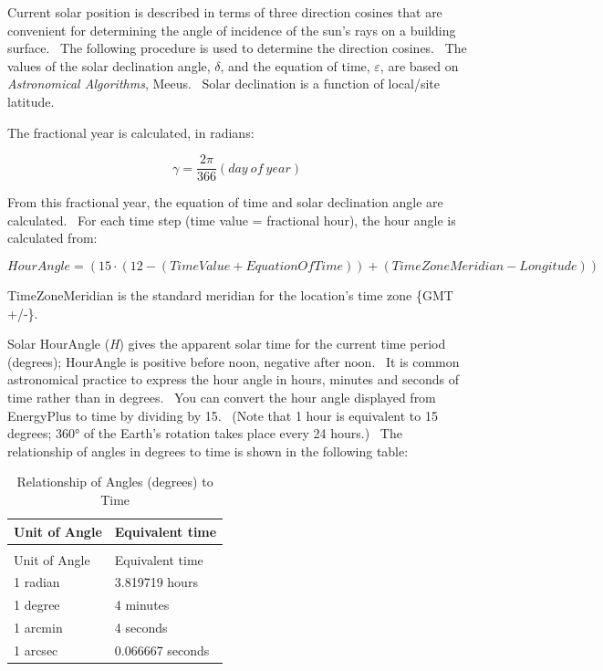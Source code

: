 Current solar position is described in terms of three direction cosines that are convenient for determining the angle of incidence of the sun's rays on a building surface.~ The following procedure is used to determine the direction cosines.~ The values of the solar declination angle, $\delta$, and the equation of time, $\varepsilon$, are based on \emph{Astronomical Algorithms}, Meeus.~ Solar declination is a function of local/site latitude.

The fractional year is calculated, in radians:

\begin{equation}
\gamma  = \frac{{2\pi }}{{366}}(day~of~year)
\end{equation}

From this fractional year, the equation of time and solar declination angle are calculated.~ For each time step (time value = fractional hour), the hour angle is calculated from:

\begin{equation}
HourAngle = \left( {15\cdot \left( {12 - \left( {TimeValue + EquationOfTime} \right)} \right) + \left( {TimeZoneMeridian - Longitude} \right)} \right)
\end{equation}

TimeZoneMeridian is the standard meridian for the location's time zone \{GMT +/-\}.

Solar HourAngle (\emph{H}) gives the apparent solar time for the current time period (degrees); HourAngle is positive before noon, negative after noon.~ It is common astronomical practice to express the hour angle in hours, minutes and seconds of time rather than in degrees.~ You can convert the hour angle displayed from EnergyPlus to time by dividing by 15.~ (Note that 1 hour is equivalent to 15 degrees; 360° of the Earth's rotation takes place every 24 hours.)~ The relationship of angles in degrees to time is shown in the following table:

\begin{longtable}[c]{@{}ll@{}}
\caption{Relationship of Angles (degrees) to Time \label{table:relationship-of-angles-degrees-to-time}} \tabularnewline
\toprule
Unit of Angle & Equivalent time \tabularnewline
\midrule
\endfirsthead

\caption[]{Relationship of Angles (degrees) to Time} \tabularnewline
\toprule
Unit of Angle & Equivalent time \tabularnewline
\midrule
\endhead

1 radian & 3.819719 hours \tabularnewline
1 degree & 4 minutes \tabularnewline
1 arcmin & 4 seconds \tabularnewline
1 arcsec & 0.066667 seconds \tabularnewline
\bottomrule
\end{longtable}

